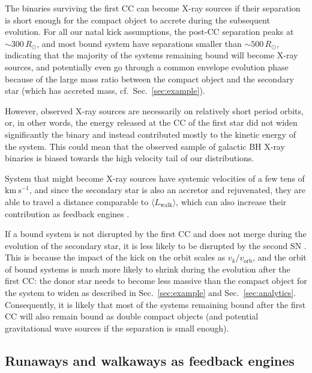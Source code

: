 \documentclass{aa}
\DeclareRobustCommand{\Secref}[1]{Sec.~\ref{#1}}
\begin{document}
The binaries surviving the first CC can
become X-ray sources if their separation is
short enough for the compact object to accrete during the subsequent evolution. For all our natal kick
assumptions, the post-CC separation peaks at $\sim300\,R_\odot$,
and most bound system have separations smaller than
$\sim500\,R_\odot$, indicating that the majority of the systems
remaining bound will become X-ray sources, and potentially even go
through a common envelope evolution phase because of the large mass
ratio between the compact object and the secondary star (which has
accreted mass, cf.~\Secref{sec:example}). 

However, observed
X-ray sources are necessarily on relatively short period orbits, or, in
other words, the energy released at the CC of the first star did not
widen significantly the binary and instead contributed mostly to the
kinetic energy of the system. This could mean that the observed sample
of galactic BH X-ray binaries is biased towards the high velocity tail
of our distributions.

System that might become X-ray sources have systemic velocities of a few tens of
$\mathrm{km\ s^{-1}}$, and since the secondary star is also an
accretor and rejuvenated, they are able to travel a
distance comparable to $\langle L_\mathrm{walk}\rangle$,
which can also increase their contribution as feedback engines
\citep[e.g.,][]{justham:12,Fragos+2013a}.

If a bound system is not disrupted by the first CC and does not merge
during the evolution of the secondary star, it is less likely to be
disrupted by the second SN \citep[e.g.][]{stevenson:17,oshaughnessy:17}. This is because the impact of the kick on the orbit
scales as $v_k/v_\mathrm{orb}$, and the orbit of bound systems is much
more likely to shrink during the evolution after the first CC: the
donor star needs to become less massive than the compact object for
the system to widen as described in
\Secref{sec:example} and \Secref{sec:analytics}. Consequently, it is likely that most of the
systems remaining bound after the first CC will also remain bound as
double compact objects (and potential gravitational wave sources if
the separation is small enough).



\subsection{Runaways and walkaways as feedback engines}
\label{sec:disrupted}
\end{document}
